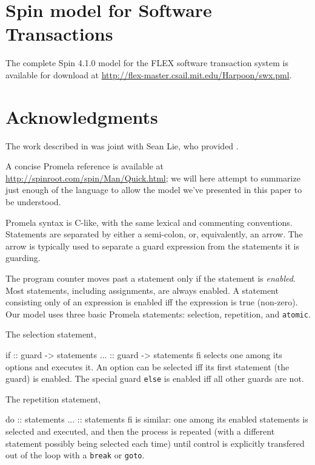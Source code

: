 \documentclass{csa-sig-alternate}
\newenvironment{inlinecode}%
  {\par\linespread{0.9}\footnotesize\samepage%
\verbatim}%
  {\endverbatim}
\begin{document}
\section*{Spin model for Software Transactions}
The complete Spin 4.1.0 model for the FLEX software transaction system is
available for download at
\url{http://flex-master.csail.mit.edu/Harpoon/swx.pml}.

\section*{Acknowledgments}
The work described in  was joint with Sean Lie, who provided
.

\small



\clearpage
\normalsize
\appendix
{}
A concise Promela reference is available at
\url{http://spinroot.com/spin/Man/Quick.html}; we will here attempt to
summarize just enough of the language to allow the model we've
presented in this paper to be understood.

Promela syntax is C-like, with the same lexical and commenting
conventions.  Statements are separated by either a semi-colon, or,
equivalently, an arrow.  The arrow is typically used to separate a
guard expression from the statements it is guarding.

The program counter moves past a statement only if the statement is
{\it enabled}.  Most
statements, including assignments, are always enabled.
A statement consisting only of an expression is enabled iff the
expression is true (non-zero).
Our model uses three basic Promela statements: selection, repetition,
and {\tt atomic}.

The selection statement,
\begin{inlinecode}
if
:: guard -> statements
...
:: guard -> statements
fi
\end{inlinecode}
selects one among its options and executes it.  An option can be
selected iff its first statement (the guard) is enabled.  The
special guard {\tt else} is enabled iff all other guards are not.

The repetition statement,
\begin{inlinecode}
do
:: statements
...
:: statements
fi
\end{inlinecode}
is similar: one among its enabled statements is selected and executed,
and then the process is repeated (with a different statement possibly
being selected each time) until control is explicitly transfered out
of the loop with a {\tt break} or {\tt goto}.
\end{document}
